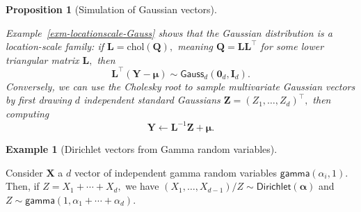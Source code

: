 \documentclass[
  11pt,
  letterpaper,
]{scrbook}
\theoremstyle{definition}
\newtheorem{example}{Example}[chapter]
\theoremstyle{plain}
\newtheorem{proposition}{Proposition}[chapter]
\theoremstyle{plain}
\theoremstyle{plain}
\theoremstyle{definition}
\theoremstyle{definition}
\theoremstyle{plain}
\newtheorem{proposition}{Proposition}[chapter]
\theoremstyle{plain}
\theoremstyle{remark}
\begin{document}
\begin{proposition}[Simulation of Gaussian
vectors]\protect\hypertarget{prp-gaussian-dist-property}{}\label{prp-gaussian-dist-property}

Example~\ref{exm-locationscale-Gauss} shows that the Gaussian
distribution is a location-scale family: if
\(\boldsymbol{L} = \mathrm{chol}(\boldsymbol{Q}),\) meaning
\(\boldsymbol{Q}=\boldsymbol{LL}^\top\) for some lower triangular matrix
\(\boldsymbol{L},\) then
\[\boldsymbol{L}^\top(\boldsymbol{Y}-\boldsymbol{\mu}) \sim \mathsf{Gauss}_d(\boldsymbol{0}_d, \mathbf{I}_d).\]
Conversely, we can use the Cholesky root to sample multivariate Gaussian
vectors by first drawing \(d\) independent standard Gaussians
\(\boldsymbol{Z}=(Z_1, \ldots, Z_d)^\top,\) then computing
\[\boldsymbol{Y} \gets \boldsymbol{L}^{-1}\boldsymbol{Z}+ \boldsymbol{\mu}.\]

\end{proposition}

\begin{example}[Dirichlet vectors from Gamma random
variables]\protect\hypertarget{exm-gamma-Drichlet}{}\label{exm-gamma-Drichlet}

Consider \(\boldsymbol{X}\) a \(d\) vector of independent gamma random
variables \(\mathsf{gamma}(\alpha_i, 1).\) Then, if
\(Z = X_1 + \cdots + X_d,\) we have
\((X_1, \ldots, X_{d-1}) / Z  \sim \mathsf{Dirichlet}(\boldsymbol{\alpha})\)
and \(Z \sim \mathsf{gamma}(1, \alpha_1 + \cdots + \alpha_d).\)

\end{example}
\end{document}
